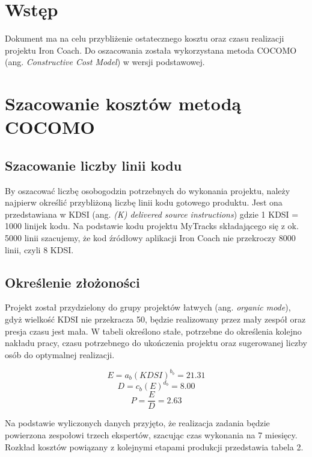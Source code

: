 



\section{Wstęp}
Dokument ma na celu przybliżenie ostatecznego kosztu oraz czasu realizacji projektu Iron Coach. Do oszacowania została wykorzystana metoda COCOMO (ang. \textit{Constructive Cost Model}) w wersji podstawowej.

\section{Szacowanie kosztów metodą COCOMO}
\subsection{Szacowanie liczby linii kodu}
By oszacować liczbę osobogodzin potrzebnych do wykonania projektu, należy najpierw określić przybliżoną liczbę linii kodu gotowego produktu. Jest ona przedstawiana w KDSI (ang. \textit{(K) delivered source instructions}) gdzie 1 KDSI = 1000 linijek kodu. Na podstawie kodu projektu MyTracks składającego się z ok. 5000 linii szacujemy, że kod źródłowy aplikacji Iron Coach nie przekroczy 8000 linii, czyli 8 KDSI.

\subsection{Określenie złożoności}
Projekt został przydzielony do grupy projektów łatwych (ang. \textit{organic mode}), gdyż wielkość KDSI nie przekracza 50, będzie realizowany przez mały zespół oraz presja czasu jest mała. W tabeli określono stałe, potrzebne do określenia kolejno nakładu pracy, czasu potrzebnego do ukończenia projektu oraz sugerowanej liczby osób do optymalnej realizacji. 

\begin{equation}\label{Nakład pracy w osobomiesiącach}
E = a_b(KDSI)^{b_b} = 21.31
\end{equation}
\begin{equation}\label{Czas potrzebny do ukończenia projektu}
D = c_b(E)^{d_b} = 8.00
\end{equation}
\begin{equation}\label{Sugerowana liczba osób}
P = \frac{E}{D} = 2.63
\end{equation}

Na podstawie wyliczonych danych przyjęto, że realizacja zadania będzie powierzona zespołowi trzech ekspertów, szacując czas wykonania na 7 miesięcy. Rozkład kosztów powiązany z kolejnymi etapami produkcji przedstawia tabela 2.

